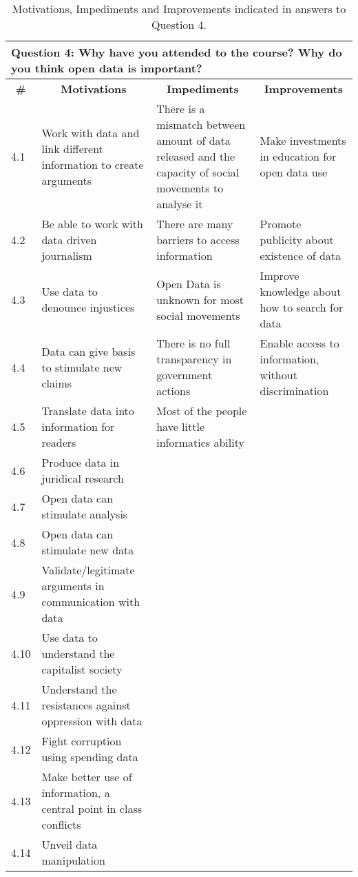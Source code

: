 \begin{table}[]
\ABNTEXfontereduzida
\caption[Motivations, Impediments and Improvements.]{Motivations, Impediments and Improvements indicated in answers to Question 4.}
\label{tab:dl_results1}
\begin{tabular}{|p{1cm}|p{4.4cm}|p{4.4cm}|p{4.4cm}|}
\hline
\multicolumn{4}{|l|}{Question 4: Why have you attended to the course? Why do you think open data is important?} \\ \hline
\multicolumn{1}{|c|}{\textbf{\#}} & \multicolumn{1}{c|}{\textbf{Motivations}}                                                                       & \multicolumn{1}{c|}{\textbf{Impediments}}                                                                                                               & \multicolumn{1}{c|}{\textbf{Improvements}} \\ \hline
4.1&Work with data and link different information to create arguments&There is a mismatch between amount of data released and the capacity of social movements to analyse it &Make investments in education for open data use\\ \hline
4.2&Be able to work with data driven journalism&There are many barriers to access information&Promote publicity about existence of data\\ \hline
4.3&Use data to denounce injustices&Open Data is unknown for most social movements&Improve knowledge about how to search for data\\ \hline
4.4&Data can give basis to stimulate new claims &There is no full transparency in government actions&Enable access to information, without discrimination\\ \hline
4.5&Translate data into information for readers&Most of the people have little informatics ability&\\ \hline
4.6&Produce data in juridical research&&\\ \hline
4.7&Open data can stimulate analysis&&\\ \hline
4.8&Open data can stimulate new data&&\\ \hline
4.9&Validate/legitimate arguments in communication with data&&\\ \hline
4.10&Use data to understand the capitalist society&&\\ \hline
4.11&Understand the resistances against oppression with data&&\\ \hline
4.12&Fight corruption using spending data &&\\ \hline
4.13&Make better use of information, a central point in class conflicts&&\\ \hline
4.14&Unveil data manipulation&&\\ \hline
\end{tabular}
\end{table}


